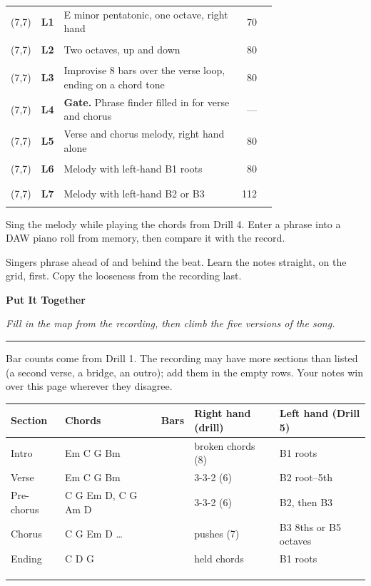 \documentclass[10pt]{article}
\makeatletter
\newcommand{\sect}[1]{\par\vspace{5pt}{\large\bfseries #1}\par\vspace{2pt}}
\newcommand{\cb}{\framebox(7,7){}}
\newenvironment{ladder}{\begin{tcolorbox}[enhanced,colback=white,colframe=black,boxrule=0.8pt,arc=2mm,
  colbacktitle=black!12,coltitle=black,fonttitle=\small\bfseries,
  title={Level ladder --- stay on a level for days or weeks; tick it when you play it clean 3 times in a row},
  left=0mm,right=0mm,top=0.5mm,bottom=0.5mm,before skip=4pt,after skip=4pt]\small
  \renewcommand{\arraystretch}{1.12}\begin{tabular}{@{\hspace{1mm}}c@{\hspace{1.5mm}}l@{\hspace{1.5mm}}p{0.745\linewidth} r@{\hspace{2mm}}p{13mm}@{}}}
  {\end{tabular}\end{tcolorbox}}
\newcommand{\lv}[3]{\cb & \textbf{#1} & #2 & \footnotesize #3 & \rule[-1pt]{13mm}{0.4pt}\\}
\newcommand{\bottom}[2]{\par\vspace{2pt}\noindent
\begin{tcbraster}[raster columns=2,raster equal height,raster column skip=3mm,
  enhanced,colback=white,colframe=black,boxrule=0.5pt,arc=2mm,colbacktitle=black!12,coltitle=black,
  fonttitle=\small\bfseries,left=2mm,right=2mm,top=1mm,bottom=1mm,fontupper=\small]
\begin{tcolorbox}[title=Make it harder]#1\end{tcolorbox}
\begin{tcolorbox}[title=In the recording]#2\end{tcolorbox}
\end{tcbraster}}
\makeatother
\begin{document}
\begin{ladder}
\lv{L1}{E minor pentatonic, one octave, right hand}{70}
\lv{L2}{Two octaves, up and down}{80}
\lv{L3}{Improvise 8 bars over the verse loop, ending on a chord tone}{80}
\lv{L4}{\textbf{Gate.} Phrase finder filled in for verse and chorus}{---}
\lv{L5}{Verse and chorus melody, right hand alone}{80}
\lv{L6}{Melody with left-hand B1 roots}{80}
\lv{L7}{Melody with left-hand B2 or B3}{112}
\end{ladder}

\bottom{Sing the melody while playing the chords from Drill 4. Enter a phrase into a DAW piano roll from memory, then compare it with the record.}
{Singers phrase ahead of and behind the beat. Learn the notes straight, on the grid, first. Copy the looseness from the recording last.}

\newpage
{\fontsize{22}{24}\selectfont\bfseries Put It Together}\par
{\itshape Fill in the map from the recording, then climb the five versions of the song.}\par
\vspace{2pt}\noindent\rule{\textwidth}{0.8pt}

\sect{Song map}
Bar counts come from Drill 1. The recording may have more sections than listed (a second verse, a bridge, an outro); add them in the empty rows. Your notes win over this page wherever they disagree.\par\vspace{3pt}
\small
\renewcommand{\arraystretch}{1.6}
\begin{tabularx}{\textwidth}{|l|l|c|X|X|}
\hline
\textbf{Section} & \textbf{Chords} & \textbf{Bars} & \textbf{Right hand (drill)} & \textbf{Left hand (Drill 5)}\\\hline
Intro & Em C G Bm & & broken chords (8) & B1 roots\\\hline
Verse & Em C G Bm & & 3-3-2 (6) & B2 root--5th\\\hline
Pre-chorus & C G Em D, C G Am D & & 3-3-2 (6) & B2, then B3\\\hline
Chorus & C G Em D \dots & & pushes (7) & B3 8ths or B5 octaves\\\hline
Ending & C D G & & held chords & B1 roots\\\hline
 & & & & \\\hline
 & & & & \\\hline
 & & & & \\\hline
\end{tabularx}\normalsize
\end{document}
